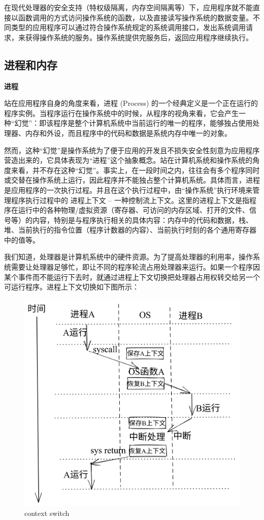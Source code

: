在现代处理器的安全支持（特权级隔离，内存空间隔离等）下，应用程序就不能直接以函数调用的方式访问操作系统的函数，以及直接读写操作系统的数据变量。不同类型的应用程序可以通过符合操作系统规定的系统调用接口，发出系统调用请求，来获得操作系统的服务。操作系统提供完服务后，返回应用程序继续执行。

\subsection{进程和内存}
\textbf{进程}

站在应用程序自身的角度来看，进程 (Process) 的一个经典定义是一个正在运行的程序实例。当程序运行在操作系统中的时候，从程序的视角来看，它会产生一种“幻觉”：即该程序是整个计算机系统中当前运行的唯一的程序，能够独占使用处理器、内存和外设，而且程序中的代码和数据是系统内存中唯一的对象。

然而，这种“幻觉”是操作系统为了便于应用的开发且不损失安全性刻意为应用程序营造出来的，它具体表现为“进程”这个抽象概念。站在计算机系统和操作系统的角度来看，并不存在这种“幻觉”。事实上，在一段时间之内，往往会有多个程序同时或交替在操作系统上运行，因此程序并不能独占整个计算机系统。具体而言，进程是应用程序的一次执行过程。并且在这个执行过程中，由“操作系统”执行环境来管理程序执行过程中的 进程上下文 – 一种控制流上下文。这里的进程上下文是指程序在运行中的各种物理/虚拟资源（寄存器、可访问的内存区域、打开的文件、信号等）的内容，特别是与程序执行相关的具体内容：内存中的代码和数据，栈、堆、当前执行的指令位置（程序计数器的内容）、当前执行时刻的各个通用寄存器中的值等。

我们知道，处理器是计算机系统中的硬件资源。为了提高处理器的利用率，操作系统需要让处理器足够忙，即让不同的程序轮流占用处理器来运行。如果一个程序因某个事件而不能运行下去时，就通过进程上下文切换把处理器占用权转交给另一个可运行程序。进程上下文切换如下图所示：
\begin{figure}[htb]
	\centering
	\includegraphics[width=\textwidth]{figures/02-01-context switch.png}
	\caption{
		context switch
	}
	\label{fig:context-switch}
\end{figure}

